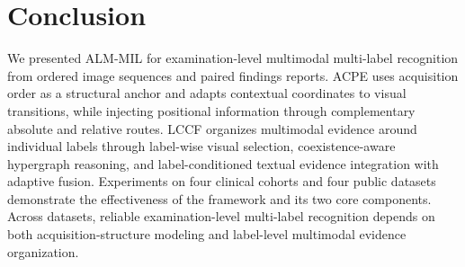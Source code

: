 \section{Conclusion}
\label{sec:conclusion}

We presented ALM-MIL for examination-level multimodal multi-label recognition
from ordered image sequences and paired findings reports. ACPE uses acquisition
order as a structural anchor and adapts contextual coordinates to visual
transitions, while injecting positional information through complementary
absolute and relative routes. LCCF organizes multimodal evidence around
individual labels through label-wise visual selection, coexistence-aware
hypergraph reasoning, and label-conditioned textual evidence integration with
adaptive fusion. Experiments on four clinical cohorts and four public datasets
demonstrate the effectiveness of the framework and its two core components.
Across datasets, reliable examination-level multi-label recognition depends on
both acquisition-structure modeling and label-level multimodal evidence
organization.

